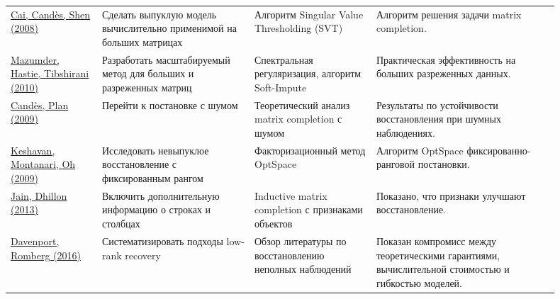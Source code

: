 \documentclass[a4paper,12pt]{article}
\begin{document}
\begin{table}[H]
\begin{tabular}{p{0.15\linewidth}p{0.25\linewidth}p{0.2\linewidth}p{0.3\linewidth}}
        \href{https://arxiv.org/abs/0810.3286}{Cai, Cand\`es, Shen (2008)}                                           & Сделать выпуклую модель вычислительно применимой на больших матрицах       & Алгоритм Singular Value Thresholding (SVT)                          & Алгоритм решения задачи matrix completion.                                                                                                  \\
        \href{https://www.jmlr.org/papers/volume11/mazumder10a/mazumder10a.pdf}{Mazumder, Hastie, Tibshirani (2010)} & Разработать масштабируемый метод для больших и разреженных матриц          & Спектральная регуляризация, алгоритм Soft-Impute                    & Практическая эффективность на больших разреженных данных.                                                                                   \\
        \href{https://arxiv.org/abs/0903.3131}{Cand\`es, Plan (2009)}                                                & Перейти к постановке с шумом                                               & Теоретический анализ matrix completion с шумом                      & Результаты по устойчивости восстановления при шумных наблюдениях.                                                                           \\
        \href{https://arxiv.org/abs/0901.3150}{Keshavan, Montanari, Oh (2009)}                                       & Исследовать невыпуклое восстановление с фиксированным рангом               & Факторизационный метод OptSpace                                     & Алгоритм OptSpace фиксированно-ранговой постановки.                                                                                         \\
        \href{https://arxiv.org/abs/1306.0626}{Jain, Dhillon (2013)}                                                 & Включить дополнительную информацию о строках и столбцах                    & Inductive matrix completion с признаками объектов                   & Показано, что признаки улучшают восстановление.                                                                                             \\
        \href{https://arxiv.org/abs/1601.06422}{Davenport, Romberg (2016)}                                           & Систематизировать подходы low-rank recovery                                & Обзор литературы по восстановлению неполных наблюдений              & Показан компромисс между теоретическими гарантиями, вычислительной стоимостью и гибкостью моделей.                                          \\
        \bottomrule
    \end{tabular}
\end{table}
\end{document}
